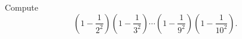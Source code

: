 Compute
\[
\left(1-\dfrac{1}{2^2}\right)\left(1-\dfrac{1}{3^2}\right)\cdots\left(1-\dfrac{1}{9^2}\right)\left(1-\dfrac{1}{10^2}\right).
\]
